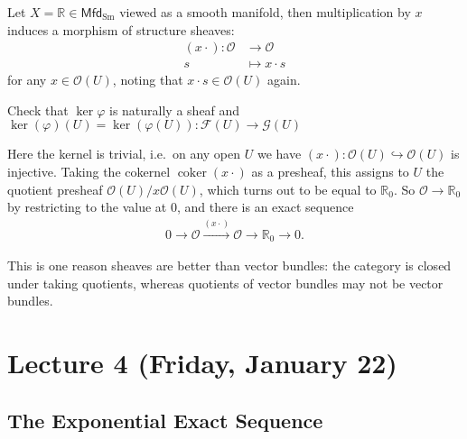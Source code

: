\begin{example}[of morphisms]

Let \(X = {\mathbb{R}}\in {\mathsf{Mfd}}_{\operatorname{Sm}}\) viewed as
a smooth manifold, then multiplication by \(x\) induces a morphism of
structure sheaves:
\begin{align*}
(x \cdot): {\mathcal{O}}&\to {\mathcal{O}}\\
s & \mapsto x\cdot s
\end{align*}
for any \(x\in {\mathcal{O}}(U)\), noting that
\(x\cdot s\in {\mathcal{O}}(U)\) again.

\begin{exercise}[?]

Check that \(\ker \varphi\) is naturally a sheaf and
\(\ker(\varphi)(U) = \ker (\varphi(U)): \mathcal{F}(U) \to \mathcal{G}(U)\)

\end{exercise}

Here the kernel is trivial, i.e.~on any open \(U\) we have
\((x\cdot):{\mathcal{O}}(U) \hookrightarrow{\mathcal{O}}(U)\) is
injective. Taking the cokernel \(\operatorname{coker}(x\cdot)\) as a
presheaf, this assigns to \(U\) the quotient presheaf
\({\mathcal{O}}(U) / x{\mathcal{O}}(U)\), which turns out to be equal to
\({\mathbb{R}}_0\). So \({\mathcal{O}}\to {\mathbb{R}}_0\) by
restricting to the value at \(0\), and there is an exact sequence
\begin{align*}
0 \to {\mathcal{O}}\xrightarrow{(x\cdot)} {\mathcal{O}}\to {\mathbb{R}}_0 \to 0
.\end{align*}

This is one reason sheaves are better than vector bundles: the category
is closed under taking quotients, whereas quotients of vector bundles
may not be vector bundles.

\end{example}

\hypertarget{lecture-4-friday-january-22}{%
\section{Lecture 4 (Friday, January
22)}\label{lecture-4-friday-january-22}}

\hypertarget{the-exponential-exact-sequence}{%
\subsection{The Exponential Exact
Sequence}\label{the-exponential-exact-sequence}}

